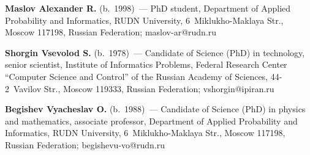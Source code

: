\vspace*{3pt}

\noindent
\textbf{Maslov Alexander R.} (b.\ 1998)~--- PhD student, Department of Applied Probability and Informatics, 
RUDN University, 6~Miklukho-Maklaya Str., Moscow 117198, Russian Federation; 
\mbox{maslov-ar@rudn.ru}

\vspace*{3pt}

\noindent
\textbf{Shorgin Vsevolod S.} (b.\ 1978)~--- Candidate of Science (PhD) in technology, senior scientist, Institute of Informatics Problems,
 Federal Research Center ``Computer Science and Control'' of the Russian Academy of Sciences, 44-2~Vavilov Str., Moscow 119333, Russian Federation; 
 \mbox{vshorgin@ipiran.ru}
 
 \vspace*{3pt}

\noindent
\textbf{Begishev Vyacheslav O.} (b.\ 1988)~--- 
Candidate of Science (PhD) in physics and mathematics, associate professor, Department of Applied Probability and Informatics, 
RUDN University, 6~Miklukho-Maklaya Str., Moscow 117198, Russian Federation; \mbox{begishevu-vo@rudn.ru}



\label{end\stat}

\renewcommand{\bibname}{\protect\rm Литература} 